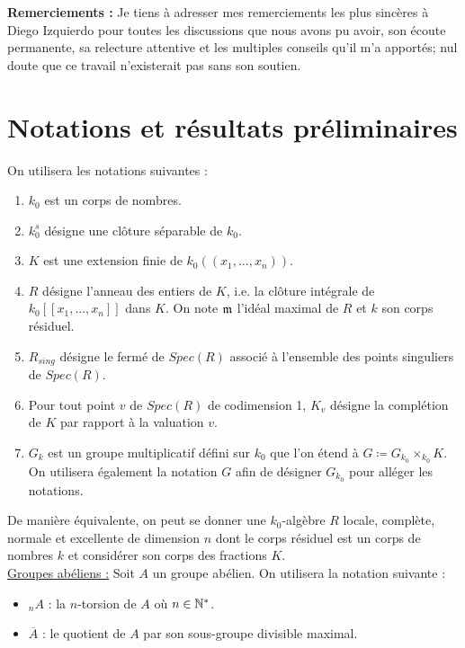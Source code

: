 \documentclass[11pt]{article}
\begin{document}
\textbf{Remerciements :} Je tiens à adresser mes remerciements les plus sincères à Diego Izquierdo pour toutes les discussions que nous avons pu avoir, son écoute permanente, sa relecture attentive et les multiples conseils qu'il m'a apportés; nul doute que ce travail n'existerait pas sans son soutien. 

\section{Notations et résultats préliminaires}
On utilisera les notations suivantes : 
\begin{enumerate}[label={$\bullet$}]
    \item $k_0$ est un corps de nombres.
    \item $k_0^s$ désigne une clôture séparable de $k_0$.
    \item $K$ est une extension finie de $k_0(\!(x_1,...,x_n)\!)$.
    \item $R$ désigne l'anneau des entiers de $K$, i.e. la clôture intégrale de $k_0[[x_1,...,x_n]]$ dans $K$. On note $\mathfrak{m}$ l'idéal maximal de $R$ et $k$ son corps résiduel.
    \item $R_{sing}$ désigne le fermé de $Spec(R)$ associé à l'ensemble des points singuliers de $Spec(R)$.
    \item Pour tout point $v$ de $Spec(R)$ de codimension 1, $K_v$ désigne la complétion de $K$ par rapport à la valuation $v$.
    \item $G_k$ est un groupe multiplicatif défini sur $k_0$ que l'on étend à $G \coloneqq G_{k_0} \times_{k_0} K$. On utilisera également la notation $G$ afin de désigner $G_{k_0}$ pour alléger les notations.
\end{enumerate}

De manière équivalente, on peut se donner une $k_0$-algèbre $R$ locale,
complète, normale et excellente de dimension $n$ dont le corps résiduel est un corps de nombres $k$ et considérer son corps des fractions $K$.\\


\underline{Groupes abéliens :} Soit $A$ un groupe abélien. On utilisera la notation suivante :
\begin{itemize}[label={$\bullet$}]
    \item ${}_{n}A$ : la $n$-torsion de $A$ où $n \in \mathbb{N}^{*}$.
    \item $\overline{A}$ : le quotient de $A$ par son sous-groupe divisible maximal.
\end{itemize}
\end{document}
